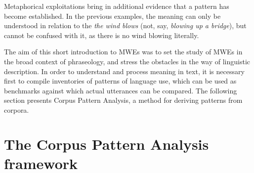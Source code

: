 \documentclass[output=paper]{langsci/langscibook}
\begin{document}
Metaphorical exploitations bring in additional evidence that a pattern
has become established. In the previous examples, the meaning can only
be understood in relation to the \textit{the wind blows} (not, say, \textit{blowing
up a bridge}), but cannot be confused with it, as there is no wind
blowing literally.



The aim of this short introduction to MWEs was to set the study of MWEs
in the broad context of phraseology, and stress the obstacles in the
way of linguistic description. In order to understand and process
meaning in text, it is necessary first to compile inventories of
patterns of language use, which can be used as benchmarks against which
actual utterances can be compared. The following section presents
Corpus Pattern Analysis, a method for deriving patterns from corpora.


\section{The Corpus Pattern Analysis framework}
\end{document}

